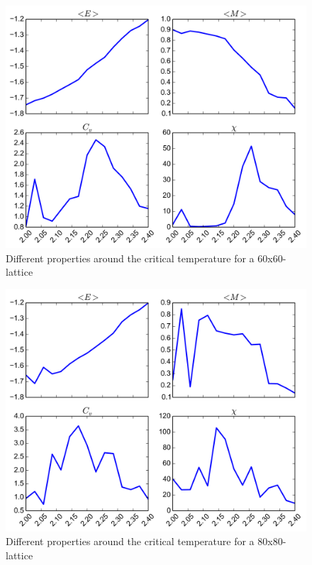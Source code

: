 \documentclass[11pt,a4paper,english]{article}
\numberwithin{equation}{section}
\newcommand{\figurewidth}{.85\textwidth}
\begin{document}
\begin{figure}
\centering
\includegraphics[width=\figurewidth]{pics/pics4report/e60.png}
\caption{Different properties around the critical temperature for 
a 60x60-lattice}
\label{fig:e60}
\end{figure}

\begin{figure}
\centering
\includegraphics[width=\figurewidth]{pics/pics4report/e80.png}
\caption{Different properties around the critical temperature for 
a 80x80-lattice}
\label{fig:e80}
\end{figure}
\end{document}
